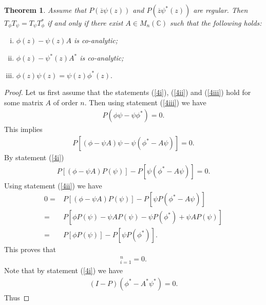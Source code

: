 \documentclass[12pt, reqno]{amsart}
\newtheorem{theorem}{Theorem}[section]
\theoremstyle{definition}
\theoremstyle{remark}
\numberwithin{equation}{section}
\begin{document}
    \begin{theorem}\label{Th4}
        Assume that $P(\overline{z}\psi(z))$ and $P(\overline{z}{\psi^*}(z))$ are regular.
        Then $T_\phi T_\psi =T_\psi T^*_\phi$ if and only if there exist $A\in M_n(\mathbb{C})$ such that  the following holds:
        \begin{enumerate}[(i)]
            \item $\phi(z)-\psi(z)A$ is co-analytic;\label{4i}
            \item $\phi(z)-\psi^*(z)A^*$ is co-analytic;\label{4ii}
            \item $\phi(z) \psi(z)=\psi(z) \phi^*(z).$ \label{4iii}
        \end{enumerate}
    \end{theorem}
        \begin{proof}
            Let us first assume that the statements (\ref{4i}), (\ref{4ii}) and (\ref{4iii}) hold for some matrix $A$ of order $n.$ Then using statement (\ref{4iii}) we have 
            \begin{align*}
                P(\phi \psi- \psi \phi^*)=0.
            \end{align*}
            This implies
            \begin{align*}
                P[(\phi-\psi A)\psi-\psi(\phi^*-A\psi)]=0.
            \end{align*}
            By statement (\ref{4i})
            \begin{align*}
                P[(\phi-\psi A)P(\psi)]-P[\psi(\phi^*-A\psi)]=0.
            \end{align*}
            Using statement (\ref{4ii}) we have
            \begin{align*}
                0=&P[(\phi-\psi A)P(\psi)]-P[\psi P(\phi^*-A\psi)]\\
                =&P[\phi P(\psi) -\psi AP(\psi)-\psi P(\phi^*)+\psi AP(\psi)]\\
                =&P[\phi P(\psi)]-P[\psi P(\phi^*)].
            \end{align*}
            This proves that
            \begin{align*}
                [(T_\phi T_\psi-T_\psi T^*_\phi)e_i]_{i=1}^{n}=0.
            \end{align*}
            Note that
            by statement (\ref{4i}) we have
            \begin{align*}
                (I-P)(\phi^*-A^*\psi^*)=0.
            \end{align*}
            Thus

\end{proof}
\end{document}
